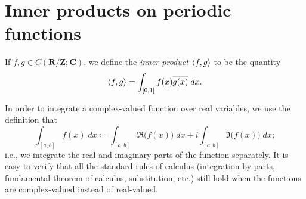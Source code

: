\section{Inner products on periodic functions}\label{sec 5.2}

\begin{definition}\label{5.2.1}
    If \(f, g \in C(\mathbf{R} / \mathbf{Z} ; \mathbf{C})\), we define the \emph{inner product} \(\inner*{f, g}\) to be the quantity
    \[
        \inner*{f, g} = \int_{[0, 1]} f(x) \overline{g(x)} \; dx.
    \]
\end{definition}

\begin{remark}\label{5.2.2}
    In order to integrate a complex-valued function over real variables, we use the definition that
    \[
        \int_{[a, b]} f(x) \; dx \coloneqq \int_{[a, b]} \Re\big(f(x)\big) \; dx + i \int_{[a,b]} \Im\big(f(x)\big) \; dx;
    \]
    i.e., we integrate the real and imaginary parts of the function separately.
    It is easy to verify that all the standard rules of calculus (integration by parts, fundamental theorem of calculus, substitution, etc.) still hold when the functions are complex-valued instead of real-valued.
\end{remark}

